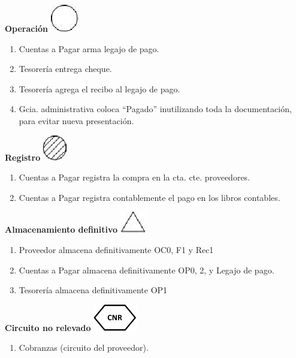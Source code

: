 \begin{center}
  \textbf{Operación}
  \includegraphics{./Images/Simbolos/simbolo-Operacion.png}
\end{center}
\begin{enumerate}
  \item Cuentas a Pagar arma legajo de pago.
  \item Tesorería entrega cheque.
  \item Tesorería agrega el recibo al legajo de pago.
  \item Gcia. administrativa coloca “Pagado” inutilizando toda la documentación, para evitar nueva presentación.
\end{enumerate}

\begin{center}
  \textbf{Registro}
  \includegraphics{./Images/Simbolos/simbolo-Registro.png}
\end{center}
\begin{enumerate}
  \item Cuentas a Pagar registra la compra en la cta. cte. proveedores.
  \item Cuentas a Pagar registra contablemente el pago en los libros contables. 
\end{enumerate}

\begin{center}
  \textbf{Almacenamiento definitivo}
  \includegraphics{./Images/Simbolos/simbolo-Almacenamiento-Definitivo.png}
\end{center}
\begin{enumerate}
  \item Proveedor almacena definitivamente OC0, F1 y Rec1
  \item Cuentas a Pagar almacena definitivamente OP0, 2, y Legajo de pago.
  \item Tesorería almacena definitivamente OP1
\end{enumerate}


\begin{center}
  \textbf{Circuito no relevado}
  \includegraphics{./Images/Simbolos/simbolo-CNR.png}
\end{center}
\begin{enumerate}
  \item Cobranzas (circuito del proveedor).
\end{enumerate}

